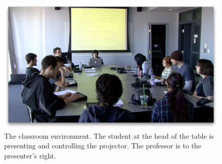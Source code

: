 










\begin{figure}[t]
\centering
\includegraphics{figures/tincan/classroom_overview.png}
\caption{The classroom environment. The student at the head of the table is presenting and controlling the projector. The professor is to the presenter's right.}
\label{f:classroom}
\end{figure}

